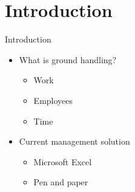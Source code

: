 \section{Introduction}
\begin{frame}{Introduction}{}
	\begin{itemize}
		\item What is ground handling?
		\begin{itemize}
			\item Work
			\item Employees
			\item Time
		\end{itemize}
		\item Current management solution
		\begin{itemize}
			\item Microsoft Excel
			\item Pen and paper
		\end{itemize}
	\end{itemize}
\end{frame}